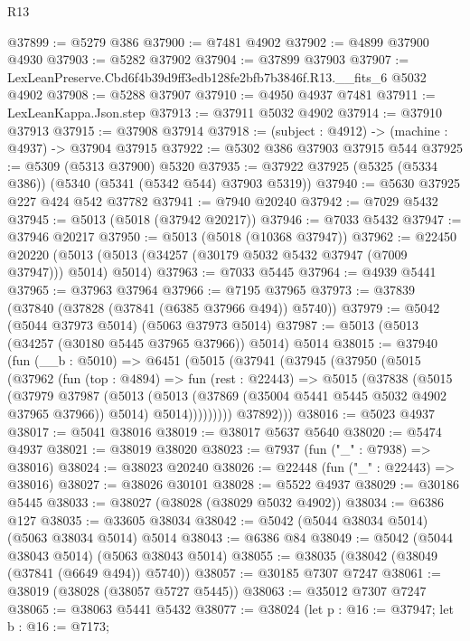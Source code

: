 \begin{lexlean}{R13}
\begin{coremodule}
@37899 := @5279 @386
@37900 := @7481 @4902
@37902 := @4899 @37900 @4930
@37903 := @5282 @37902
@37904 := @37899 @37903
@37907 := LexLeanPreserve.Cbd6f4b39d9ff3edb128fe2bfb7b3846f.R13.__fits_6 @5032 @4902
@37908 := @5288 @37907
@37910 := @4950 @4937 @7481
@37911 := LexLeanKappa.Json.step
@37913 := @37911 @5032 @4902
@37914 := @37910 @37913
@37915 := @37908 @37914
@37918 := (subject : @4912) -> (machine : @4937) -> @37904 @37915
@37922 := @5302 @386 @37903 @37915 @544
@37925 := @5309 (@5313 @37900) @5320
@37935 := @37922 @37925 (@5325 (@5334 @386)) (@5340 (@5341 (@5342 @544) @37903 @5319))
@37940 := @5630 @37925 @227 @424 @542 @37782
@37941 := @7940 @20240
@37942 := @7029 @5432
@37945 := @5013 (@5018 (@37942 @20217))
@37946 := @7033 @5432
@37947 := @37946 @20217
@37950 := @5013 (@5018 (@10368 @37947))
@37962 := @22450
    @20220
    (@5013 (@5013 (@34257 (@30179 @5032 @5432 @37947 (@7009 @37947))) @5014) @5014)
@37963 := @7033 @5445
@37964 := @4939 @5441
@37965 := @37963 @37964
@37966 := @7195 @37965
@37973 := @37839 (@37840 (@37828 (@37841 (@6385 @37966 @494)) @5740))
@37979 := @5042 (@5044 @37973 @5014) (@5063 @37973 @5014)
@37987 := @5013 (@5013 (@34257 (@30180 @5445 @37965 @37966)) @5014) @5014
@38015 := @37940
    (fun (__b : @5010) =>
    @6451
      (@5015
        (@37941
          (@37945
            (@37950
              (@5015
                (@37962
                  (fun (top : @4894) =>
                  fun (rest : @22443) =>
                  @5015
                    (@37838
                      (@5015
                        (@37979
                          @37987
                          (@5013
                            (@5013 (@37869 (@35004 @5441 @5445 @5032 @4902 @37965 @37966)) @5014)
                            @5014)))))))))
          @37892)))
@38016 := @5023 @4937
@38017 := @5041 @38016
@38019 := @38017 @5637 @5640
@38020 := @5474 @4937
@38021 := @38019 @38020
@38023 := @7937 (fun ("_" : @7938) => @38016)
@38024 := @38023 @20240
@38026 := @22448 (fun ("_" : @22443) => @38016)
@38027 := @38026 @30101
@38028 := @5522 @4937
@38029 := @30186 @5445
@38033 := @38027 (@38028 (@38029 @5032 @4902))
@38034 := @6386 @127
@38035 := @33605 @38034
@38042 := @5042 (@5044 @38034 @5014) (@5063 @38034 @5014) @5014
@38043 := @6386 @84
@38049 := @5042 (@5044 @38043 @5014) (@5063 @38043 @5014)
@38055 := @38035 (@38042 (@38049 (@37841 (@6649 @494)) @5740))
@38057 := @30185 @7307 @7247
@38061 := @38019 (@38028 (@38057 @5727 @5445))
@38063 := @35012 @7307 @7247
@38065 := @38063 @5441 @5432
@38077 := @38024
    (let p : @16 := @37947;
    let b : @16 := @7173;

\end{coremodule}
\end{lexlean}
